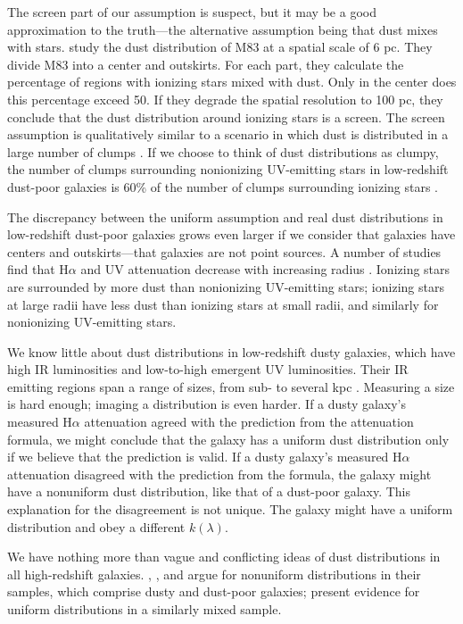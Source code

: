 \documentclass[preprint]{aastex}
\begin{document}
The screen part of our assumption is suspect, but it may be a
good approximation to the truth---the alternative assumption being that dust
mixes with stars.  \citet{liu13} study the dust distribution of M83 at a
spatial scale of 6 pc.  They divide M83 into a center and outskirts.  For each
part, they calculate the percentage of regions with ionizing stars mixed with
dust.  Only in the center does this percentage exceed 50.  If they degrade the
spatial resolution to 100 pc, they conclude that the dust distribution around
ionizing stars is a screen.  The screen assumption is qualitatively similar to
a scenario in which dust is distributed in a large number of clumps
\citep{calzetti94}.  If we choose to think of dust distributions as clumpy, the
number of clumps surrounding nonionizing UV-emitting stars in low-redshift
dust-poor galaxies is 60\% of the number of clumps surrounding ionizing stars
\citep{calzetti97a}.

The discrepancy between the uniform assumption and real dust
distributions in low-redshift dust-poor galaxies grows even larger if we
consider that galaxies have centers and outskirts---that galaxies are not
point sources.  A number of studies find
that H$\alpha$ and UV attenuation decrease with increasing radius
\citep{boissier04,prescott07,munoz09}.  Ionizing stars are surrounded by more
dust than nonionizing UV-emitting stars; ionizing stars
at large radii have less dust than ionizing stars at small radii, and similarly
for nonionizing UV-emitting stars.

We know little about dust distributions in low-redshift dusty galaxies, which
have high IR luminosities and low-to-high emergent UV luminosities.  Their
IR emitting regions span a range of sizes, from sub- to several kpc
\citep{diaz10}.  Measuring a size is hard enough; imaging a distribution is
even harder.  If a dusty galaxy's measured H$\alpha$ attenuation agreed with
the prediction from the \citet{calzetti00} attenuation formula, we might
conclude that the galaxy has a uniform dust distribution only if we believe
that the prediction is valid.  If a dusty galaxy's measured H$\alpha$
attenuation disagreed with the prediction from the \citet{calzetti00}
formula, the galaxy might have a nonuniform dust distribution, like that of a
dust-poor galaxy.  This explanation for the disagreement is not unique.  The
galaxy might have a uniform distribution and obey a different $k(\lambda)$.

We have nothing more than vague and conflicting ideas of dust distributions in
all high-redshift galaxies.  \citet{onodera10}, \citet{kashino13}, and 
\citet{price13} argue for nonuniform distributions in their samples, which
comprise dusty and dust-poor galaxies; \citet{erb06} present evidence for
uniform distributions in a similarly mixed sample.
\end{document}
